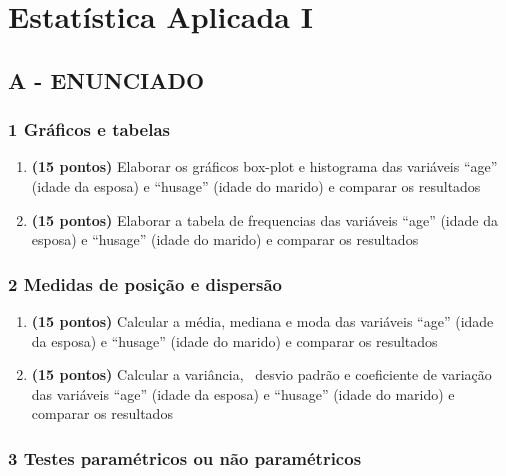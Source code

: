 \label{ap:ap04}
\chapter{Estatística Aplicada I}
\section*{\textbf{A - ENUNCIADO}}
\subsection*{\textbf{1 Gráficos e tabelas}}


\begin{enumerate}[label=\alph*)]
\item \textbf{(15 pontos)} Elaborar os gráficos box-plot e histograma das variáveis “age” (idade da esposa) e “husage” (idade do
marido) e comparar os resultados
\item \textbf{(15 pontos)} Elaborar a tabela de frequencias das variáveis “age” (idade da esposa) e “husage” (idade do marido) e
comparar os resultados
\end{enumerate}

\subsection*{\textbf{2 Medidas de posição e dispersão}}

\begin{enumerate}[label=\alph*)]
\item \textbf{(15 pontos)} Calcular a média, mediana e moda das variáveis “age” (idade da esposa) e “husage” (idade do marido) e
comparar os resultados
\item \textbf{(15 pontos)} Calcular a variância, \ desvio padrão e coeficiente de variação das variáveis “age” (idade da esposa) e
“husage” (idade do marido) e comparar os resultados
\end{enumerate}



\subsection*{\textbf{3 Testes paramétricos ou não paramétricos}}

